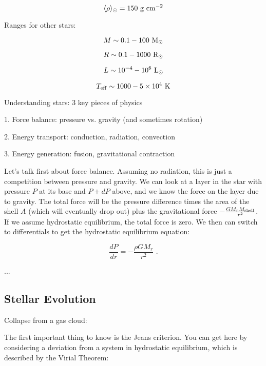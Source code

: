 \begin{equation}
\langle \rho \rangle_\odot = 150~{\rm g}~{\rm cm}^{-2}
\end{equation}

Ranges for other stars:

\begin{equation}
M \sim 0.1 - 100~{\rm M}_\odot
\end{equation}

\begin{equation}
R \sim 0.1 - 1000~{\rm R}_\odot
\end{equation}

\begin{equation}
L \sim 10^{-4} - 10^6~{\rm L}_\odot
\end{equation}

\begin{equation}
T_{\rm eff} \sim 1000 - 5 \times 10^4~{\rm K}
\end{equation}

Understanding stars: 3 key pieces of physics

1. Force balance: pressure vs. gravity (and sometimes rotation)

2. Energy transport: conduction, radiation, convection

3. Energy generation: fusion, gravitational contraction

Let's talk first about force balance. Assuming no radiation, this is just a competition between pressure and gravity. We can look at a layer in the star with pressure $P$ at its base and $P+dP$ above, and we know the force on the layer due to gravity. The total force will be the pressure difference times the area of the shell $A$ (which will eventually drop out) plus the gravitational force $-\frac{G M_r M_{\rm shell}}{r^2}$. If we assume hydrostatic equilibrium, the total force is zero. We then can switch to differentials to get the hydrostatic equilibrium equation:

\begin{equation}
\frac{dP}{dr} = -\frac{\rho G M_r}{r^2}\,\,.
\end{equation}

...


\subsection{Stellar Evolution}

Collapse from a gas cloud:

The first important thing to know is the Jeans criterion. You can get here by considering a deviation from a system in hydrostatic equilibrium, which is described by the Virial Theorem:

